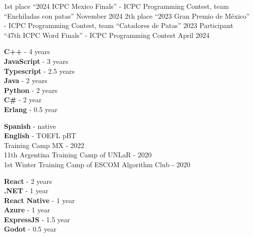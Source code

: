 \documentclass[9pt]{developercv} %
\begin{document}

\begin{entrylist}
	\entry
		{1st place}
		{``2024 ICPC Mexico Finals'' - ICPC Programming Contest, team ``Enchiladas con patas''}
		{November 2024}
		{}
	\entry
		{2th place}
		{``2023 Gran Premio de México'' - ICPC Programming Contest, team ``Catadores de Patas''}
		{2023}
		{}
	\entry
		{Participant}
		{``47th ICPC Word Finals'' - ICPC Programming Contest}
		{April 2024}
		{}
\end{entrylist}


\begin{minipage}[t]{0.25\textwidth}
	\vspace{-\baselineskip} %

	
	\textbf{C++} - 4 years\\
	\textbf{JavaScript} - 3 years\\
	\textbf{Typescript} - 2.5 years\\
	\textbf{Java} - 2 years\\
	\textbf{Python} - 2 years\\
	\textbf{C\#} - 2 year\\
    \textbf{Erlang} - 0.5 year
\end{minipage}
\hfill
\begin{minipage}[t]{0.48\textwidth}
	\vspace{-\baselineskip} %
	
	
	\textbf{Spanish} - native\\
	\textbf{English} - TOEFL pBT \\

	Training Camp MX - 2022\\
	11th Argentina Training Camp of UNLaR - 2020\\
	1st Winter Training Camp of ESCOM Algorithm Club - 2020
 
\end{minipage}
\hfill
\begin{minipage}[t]{0.17\textwidth}
	\vspace{-\baselineskip} %


    \textbf{React} - 2 years\\
	\textbf{.NET} - 1 year\\
    \textbf{React Native} - 1 year\\
    \textbf{Azure} - 1 year\\
    \textbf{ExpressJS} - 1.5 year\\
    \textbf{Godot} - 0.5 year

\end{minipage}

\end{document}
